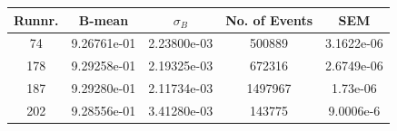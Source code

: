 \documentclass[12pt, letterpaper]{article}
\begin{document}
\begin{tabular}{|c|c|c|c|c|}
\hline
Runnr. & B-mean & $\sigma_{B}$ & No. of Events & SEM\\
\hline
74		&	 9.26761e-01	&	2.23800e-03	&  500889 &	3.1622e-06 \\
178		&	9.29258e-01	&	2.19325e-03	&  672316 & 2.6749e-06 \\
187 		&	9.29280e-01	&	2.11734e-03	& 1497967  & 1.73e-06 \\
202		&	9.28556e-01 	&	3.41280e-03	& 143775 & 9.0006e-6 \\


\hline

\end{tabular}
\end{document}
